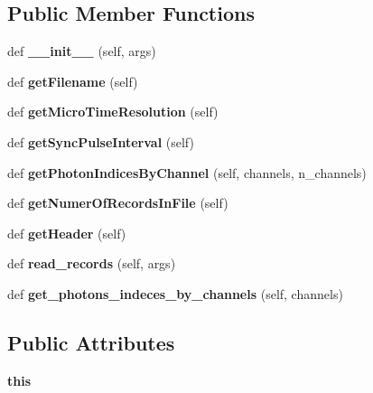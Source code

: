 \subsection*{Public Member Functions}
\begin{DoxyCompactItemize}
\item 
\mbox{\label{classtttrlib_1_1_t_t_t_r_a41c590e597a2ca378bbadd76c8d369fa}} 
def {\bfseries \+\_\+\+\_\+init\+\_\+\+\_\+} (self, args)
\item 
\mbox{\label{classtttrlib_1_1_t_t_t_r_ab4dd62d9623cdf6a7e1b37cb409f003c}} 
def {\bfseries get\+Filename} (self)
\item 
\mbox{\label{classtttrlib_1_1_t_t_t_r_af0faddea1867339d1be1cd04452399a1}} 
def {\bfseries get\+Micro\+Time\+Resolution} (self)
\item 
\mbox{\label{classtttrlib_1_1_t_t_t_r_af2ac1c61f69f3d7a264452198605ffe4}} 
def {\bfseries get\+Sync\+Pulse\+Interval} (self)
\item 
\mbox{\label{classtttrlib_1_1_t_t_t_r_afabecf714a9bd08e45e6274e4b8959c6}} 
def {\bfseries get\+Photon\+Indices\+By\+Channel} (self, channels, n\+\_\+channels)
\item 
\mbox{\label{classtttrlib_1_1_t_t_t_r_ab5ed5e380b3d1457ef32df090ee88aad}} 
def {\bfseries get\+Numer\+Of\+Records\+In\+File} (self)
\item 
\mbox{\label{classtttrlib_1_1_t_t_t_r_a997da182f60ad3674077e4acb6d91e3c}} 
def {\bfseries get\+Header} (self)
\item 
\mbox{\label{classtttrlib_1_1_t_t_t_r_a5a677e7c4db0927f48c6190b23876c48}} 
def {\bfseries read\+\_\+records} (self, args)
\item 
\mbox{\label{classtttrlib_1_1_t_t_t_r_a17187d488d681aebf5a4c20401a6cd02}} 
def {\bfseries get\+\_\+photons\+\_\+indeces\+\_\+by\+\_\+channels} (self, channels)
\end{DoxyCompactItemize}
\subsection*{Public Attributes}
\begin{DoxyCompactItemize}
\item 
\mbox{\label{classtttrlib_1_1_t_t_t_r_af36fc0ef4bfe335753df62cd6d1fd736}} 
{\bfseries this}
\end{DoxyCompactItemize}
